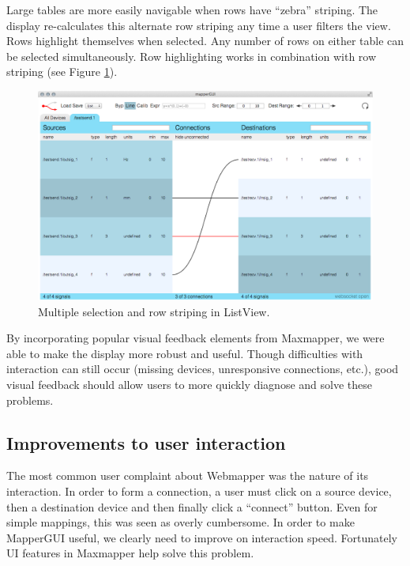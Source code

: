 Large tables are more easily navigable when rows have ``zebra'' striping. The display re-calculates this alternate row striping any time a user filters the view. Rows highlight themselves when selected. Any number of rows on either table can be selected simultaneously. Row highlighting works in combination with row striping (see Figure \ref{fig:row_striping}).

\begin{figure}[!h]
	\centering
	\includegraphics[width=1\textwidth]{figures/row_striping}
	\caption{Multiple selection and row striping in ListView.}
	\label{fig:row_striping}
\end{figure}

By incorporating popular visual feedback elements from Maxmapper, we were able to make the display more robust and useful. Though difficulties with interaction can still occur (missing devices, unresponsive connections, etc.), good visual feedback should allow users to more quickly diagnose and solve these problems.


	\subsection{Improvements to user interaction} %
	\label{sub:improvements_to_user_interaction}

The most common user complaint about Webmapper was the nature of its interaction. In order to form a connection, a user must click on a source device, then a destination device and then finally click a ``connect'' button. Even for simple mappings, this was seen as overly cumbersome. In order to make MapperGUI useful, we clearly need to improve on interaction speed. Fortunately UI features in Maxmapper help solve this problem.
	
